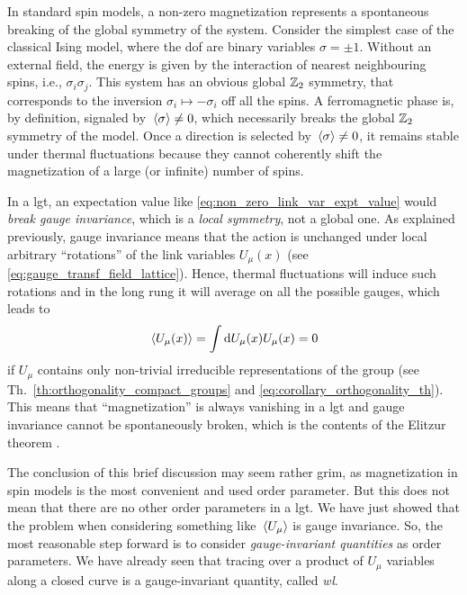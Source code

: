 In standard spin models, a non-zero magnetization represents a spontaneous breaking of the global symmetry of the system.
Consider the simplest case of the classical Ising model, where the \ac{dof} are binary variables $\sigma = \pm 1$.
Without an external field, the energy is given by the interaction of nearest neighbouring spins, i.e., $\sigma_i \sigma_j$.
This system has an obvious global $\mathbb{Z}_2$ symmetry, that corresponds to the inversion $\sigma_i \mapsto -\sigma_i$ off all the spins.
A ferromagnetic phase is, by definition, signaled by $\ev*{\sigma} \neq 0$, which necessarily breaks the global $\mathbb{Z}_2$ symmetry of the model.
Once a direction is selected by $\ev*{\sigma} \neq 0$, it remains stable under thermal fluctuations because they cannot coherently shift the magnetization of a large (or infinite) number of spins.

In a \ac{lgt}, an expectation value like \eqref{eq:non_zero_link_var_expt_value} would \emph{break gauge invariance}, which is a \emph{local symmetry}, not a global one.
As explained previously, gauge invariance means that the action is unchanged under local arbitrary ``rotations'' of the link variables $U_{\mu}(x)$ (see \eqref{eq:gauge_transf_field_lattice}).
Hence, thermal fluctuations will induce such rotations and in the long rung it will average on all the possible gauges, which leads to
\begin{equation}
    \ev*{U_{\mu}(x)} = \int \dd U_{\mu}(x) U_{\mu}(x) = 0
\end{equation}
if $U_{\mu}$ contains only non-trivial irreducible representations of the group (see Th.~\ref{th:orthogonality_compact_groups} and \eqref{eq:corollary_orthogonality_th}).
This means that ``magnetization'' is always vanishing in a \ac{lgt} and gauge invariance cannot be spontaneously broken, which is the contents of the Elitzur theorem \cite{elitzur1975theorem}.

The conclusion of this brief discussion may seem rather grim, as magnetization in spin models is the most convenient and used order parameter.
But this does not mean that there are no other order parameters in a \ac{lgt}.
We have just showed that the problem when considering something like $\ev*{U_{\mu}}$ is gauge invariance.
So, the most reasonable step forward is to consider \emph{gauge-invariant quantities} as order parameters.
We have already seen that tracing over a product of $U_{\mu}$ variables along a closed curve is a gauge-invariant quantity, called \emph{\ac{wl}}.

